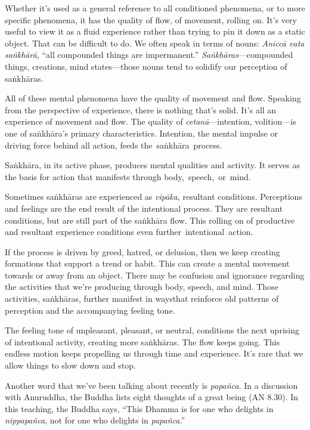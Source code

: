 Whether it's used as a general reference to all conditioned phenomena, or to more specific phenomena, it has the quality of flow, of movement, rolling on. It's very useful to view it as a fluid experience rather than trying to pin it down as a static object. That can be difficult to do. We often speak in terms of nouns: \emph{Aniccā vata saṅkhārā}, ``all compounded things are impermanent.'' \emph{Saṅkhāras}---compounded things, creations, mind states---those nouns tend to solidify our perception of saṅkhāras.

All of these mental phenomena have the quality of movement and flow. Speaking from the perspective of experience, there is nothing that's solid. It's all an experience of movement and flow. The quality of \emph{cetanā}---intention, volition---is one of saṅkhāra's primary characteristics. Intention, the mental impulse or driving force behind all action, feeds \mbox{the saṅkhāra process.}

Saṅkhāra, in its active phase, produces mental qualities and activity. It serves as the basis for action that manifests through \mbox{body, speech, or mind}.

\enlargethispage{-1\baselineskip}
Sometimes saṅkhāras are experienced as \emph{vipāka}, resultant conditions. Perceptions and feelings are the end result of the intentional process. They are resultant conditions, but are still part of the saṅkhāra flow. This rolling on of productive and resultant experience conditions even \mbox{further intentional action.}

If the process is driven by greed, hatred, or delusion, then we keep creating formations that support a trend or habit. This can create a mental movement towards or away from an object. There may be confusion and ignorance regarding the activities that we're producing through body, speech, and mind. Those activities, saṅkhāras, further manifest in waysthat reinforce old patterns of perception and the accompanying feeling tone.

The feeling tone of unpleasant, pleasant, or neutral, conditions the next uprising of intentional activity, creating more saṅkhāras. The flow keeps going. This endless motion keeps propelling us through time and experience. It's rare that we allow things to slow down and stop.

Another word that we've been talking about recently is \emph{papañca}. In a discussion with Anuruddha, the Buddha lists eight thoughts of a great being (AN 8.30). In this teaching, the Buddha says, ``This Dhamma is for one who delights in \emph{nippapañca}, not for one who delights in \emph{papañca}.''

